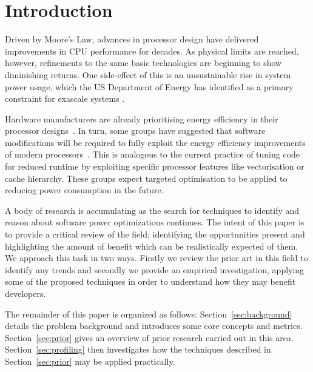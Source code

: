 \section*{Introduction}
Driven by Moore's Law, advances in processor design have delivered improvements in CPU performance for decades. As physical limits are reached, however, refinements to the same basic technologies are beginning to show diminishing returns. One side-effect of this is an unsustainable rise in system power usage, which the US Department of Energy has identified as a primary constraint for exascale systems \cite{shalf:2011aa}.

Hardware manufacturers are already prioritising energy efficiency in their processor designs~\cite{kurd:2014aa}. In turn, some groups have suggested that software modifications will be required to fully exploit the energy efficiency improvements of modern processors~\cite{shao:2013aa}. This is analogous to the current practice of tuning code for reduced runtime by exploiting specific processor features like vectorisation or cache hierarchy. These groups expect targeted optimisation to be applied to reducing power consumption in the future.

A body of research is accumulating as the search for techniques to identify and reason about software power optimizations continues. The intent of this paper is to provide a critical review of the field; identifying the opportunities present and highlighting the amount of benefit which can be realistically expected of them. We approach this task in two ways. Firstly we review the prior art in this field to identify any trends and secondly we provide an empirical investigation, applying some of the proposed techniques in order to understand how they may benefit developers.

The remainder of this paper is organized as follows: Section~\ref{sec:background} details the problem background and introduces some core concepts and metrics. Section~\ref{sec:prior} gives an overview of prior research carried out in this area. Section~\ref{sec:profiling} then investigates how the techniques described in Section~\ref{sec:prior} may be applied practically.
